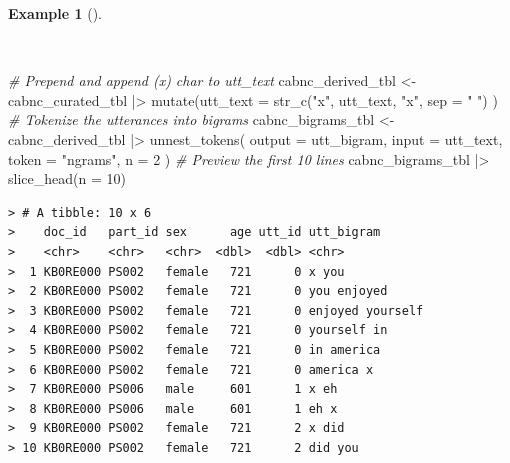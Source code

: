 \documentclass[
  letterpaper,
  DIV=11,
  numbers=noendperiod]{scrreport}
\newenvironment{Shaded}{\begin{snugshade}}{\end{snugshade}}
\newcommand{\AttributeTok}[1]{\textcolor[rgb]{0.00,0.00,0.00}{#1}}
\newcommand{\CommentTok}[1]{\textcolor[rgb]{0.00,0.00,0.00}{\textit{#1}}}
\newcommand{\DecValTok}[1]{\textcolor[rgb]{0.00,0.00,0.00}{#1}}
\newcommand{\FunctionTok}[1]{\textcolor[rgb]{0.00,0.00,0.00}{#1}}
\newcommand{\NormalTok}[1]{\textcolor[rgb]{0.00,0.00,0.00}{#1}}
\newcommand{\OtherTok}[1]{\textcolor[rgb]{0.00,0.00,0.00}{#1}}
\newcommand{\SpecialCharTok}[1]{\textcolor[rgb]{0.00,0.00,0.00}{#1}}
\newcommand{\StringTok}[1]{\textcolor[rgb]{0.00,0.00,0.00}{#1}}
\theoremstyle{definition}
\newtheorem{example}{Example}[chapter]
\theoremstyle{remark}
\begin{document}
\begin{example}[]\protect\hypertarget{exm-td-cabnc-tokenization-bigrams-tidytext-start-end}{}\label{exm-td-cabnc-tokenization-bigrams-tidytext-start-end}

~

\begin{Shaded}
\begin{Highlighting}[]
\CommentTok{\# Prepend and append (x) char to \textasciigrave{}utt\_text\textasciigrave{}}
\NormalTok{cabnc\_derived\_tbl }\OtherTok{\textless{}{-}} 
\NormalTok{  cabnc\_curated\_tbl }\SpecialCharTok{|\textgreater{}}
  \FunctionTok{mutate}\NormalTok{(}\AttributeTok{utt\_text =} \FunctionTok{str\_c}\NormalTok{(}\StringTok{"x"}\NormalTok{, utt\_text, }\StringTok{"x"}\NormalTok{, }\AttributeTok{sep =} \StringTok{" "}\NormalTok{)}
\NormalTok{  )}
\CommentTok{\# Tokenize the utterances into bigrams}
\NormalTok{cabnc\_bigrams\_tbl }\OtherTok{\textless{}{-}} 
\NormalTok{  cabnc\_derived\_tbl }\SpecialCharTok{|\textgreater{}}
  \FunctionTok{unnest\_tokens}\NormalTok{(}
    \AttributeTok{output =}\NormalTok{ utt\_bigram, }
    \AttributeTok{input =}\NormalTok{ utt\_text, }
    \AttributeTok{token =} \StringTok{"ngrams"}\NormalTok{,}
    \AttributeTok{n =} \DecValTok{2}
\NormalTok{  )}
\CommentTok{\# Preview the first 10 lines}
\NormalTok{cabnc\_bigrams\_tbl }\SpecialCharTok{|\textgreater{}}
  \FunctionTok{slice\_head}\NormalTok{(}\AttributeTok{n =} \DecValTok{10}\NormalTok{)}
\end{Highlighting}
\end{Shaded}

\begin{verbatim}
> # A tibble: 10 x 6
>    doc_id   part_id sex      age utt_id utt_bigram      
>    <chr>    <chr>   <chr>  <dbl>  <dbl> <chr>           
>  1 KB0RE000 PS002   female   721      0 x you           
>  2 KB0RE000 PS002   female   721      0 you enjoyed     
>  3 KB0RE000 PS002   female   721      0 enjoyed yourself
>  4 KB0RE000 PS002   female   721      0 yourself in     
>  5 KB0RE000 PS002   female   721      0 in america      
>  6 KB0RE000 PS002   female   721      0 america x       
>  7 KB0RE000 PS006   male     601      1 x eh            
>  8 KB0RE000 PS006   male     601      1 eh x            
>  9 KB0RE000 PS002   female   721      2 x did           
> 10 KB0RE000 PS002   female   721      2 did you
\end{verbatim}

\end{example}
\end{document}
